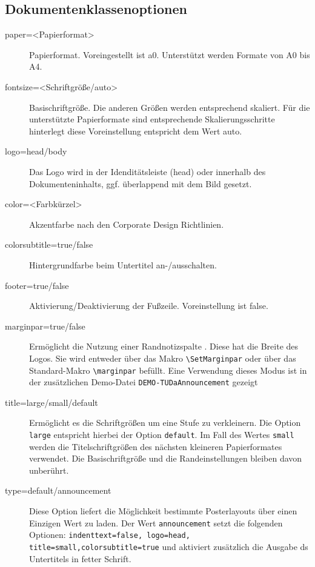 \documentclass[
	paper=a0,
	ngerman,
	accentcolor=9c,
	logo=body,%
	footer=true,
	]{tudaposter}
\let\file\texttt
\let\code\texttt
\let\tbs\textbackslash
\begin{document}
\begin{multicols}{2}
\subsection*{Dokumentenklassenoptionen}
\begin{description}
	\item[paper=<Papierformat>] Papierformat. Voreingestellt ist a0. Unterstützt werden Formate von A0 bis A4. 
	\item[fontsize=<Schriftgröße/auto>] Basischriftgröße. Die anderen Größen werden entsprechend skaliert. Für die unterstützte Papierformate sind entsprechende Skalierungsschritte hinterlegt diese Voreinstellung entspricht dem Wert auto.
	\item[logo=head/body] Das Logo wird in der Idenditätsleiste (head) oder innerhalb des Dokumenteninhalts, ggf. überlappend mit dem Bild gesetzt.
	\item[color=<Farbkürzel>] Akzentfarbe nach den Corporate Design Richtlinien.
	\item[colorsubtitle=true/false] Hintergrundfarbe beim Untertitel an-/ausschalten.
	\item[footer=true/false] Aktivierung/Deaktivierung der Fußzeile. Voreinstellung ist false.
	\item[marginpar=true/false] Ermöglicht die Nutzung einer Randnotizspalte . Diese hat die Breite des Logos. Sie wird entweder über das Makro \code{\tbs{}SetMarginpar} oder über das Standard-Makro \code{\tbs{}marginpar} befüllt. Eine Verwendung dieses Modus ist in der zusätzlichen Demo-Datei \file{DEMO-TUDaAnnouncement} gezeigt
	\item[title=large/small/default] Ermöglicht es die Schriftgrößen um eine Stufe zu verkleinern. Die Option \code{large} entspricht hierbei der Option \code{default}. Im Fall des Wertes \code{small} werden die Titelschriftgrößen des nächsten kleineren Papierformates verwendet. Die Basischriftgröße und die Randeinstellungen bleiben davon unberührt.
	\item[type=default/announcement] Diese Option liefert die Möglichkeit bestimmte Posterlayouts über einen Einzigen Wert zu laden.
	Der Wert \code{announcement} setzt die folgenden Optionen: \code{indenttext=false, logo=head, title=small,colorsubtitle=true} und aktiviert zusätzlich die Ausgabe ds Untertitels in fetter Schrift.
\end{description}
\end{multicols}
\end{document}

